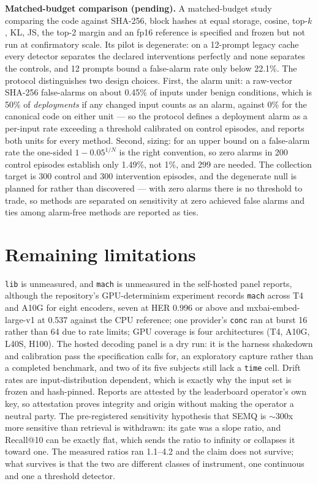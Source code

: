 \documentclass{article}
\begin{document}
\textbf{Matched-budget comparison (pending).} A matched-budget study comparing the code against SHA-256, block hashes at equal storage, cosine, top-$k$, KL, JS, the top-2 margin and an fp16 reference is specified and frozen but not run at confirmatory scale. Its pilot is degenerate: on a 12-prompt legacy cache every detector separates the declared interventions perfectly and none separates the controls, and 12 prompts bound a false-alarm rate only below 22.1\%. The protocol distinguishes two design choices. First, the alarm unit: a raw-vector SHA-256 false-alarms on about 0.45\% of inputs under benign conditions, which is 50\% of \emph{deployments} if any changed input counts as an alarm, against 0\% for the canonical code on either unit --- so the protocol defines a deployment alarm as a per-input rate exceeding a threshold calibrated on control episodes, and reports both units for every method. Second, sizing: for an upper bound on a false-alarm rate the one-sided $1-0.05^{1/N}$ is the right convention, so zero alarms in 200 control episodes establish only 1.49\%, not 1\%, and 299 are needed. The collection target is 300 control and 300 intervention episodes, and the degenerate null is planned for rather than discovered --- with zero alarms there is no threshold to trade, so methods are separated on sensitivity at zero achieved false alarms and ties among alarm-free methods are reported as ties.

\section{Remaining limitations}\label{app:limits}

\texttt{lib} is unmeasured, and \texttt{mach} is unmeasured in the self-hosted panel reports, although the repository's GPU-determinism experiment records \texttt{mach} across T4 and A10G for eight encoders, seven at HER 0.996 or above and mxbai-embed-large-v1 at 0.537 against the CPU reference; one provider's \texttt{conc} ran at burst 16 rather than 64 due to rate limits; GPU coverage is four architectures (T4, A10G, L40S, H100). The hosted decoding panel is a dry run: it is the harness shakedown and calibration pass the specification calls for, an exploratory capture rather than a completed benchmark, and two of its five subjects still lack a \texttt{time} cell. Drift rates are input-distribution dependent, which is exactly why the input set is frozen and hash-pinned. Reports are attested by the leaderboard operator's own key, so attestation proves integrity and origin without making the operator a neutral party. The pre-registered sensitivity hypothesis that SEMQ is ${\sim}300$x more sensitive than retrieval is withdrawn: its gate was a slope ratio, and Recall@10 can be exactly flat, which sends the ratio to infinity or collapses it toward one. The measured ratios ran 1.1--4.2 and the claim does not survive; what survives is that the two are different classes of instrument, one continuous and one a threshold detector.
\end{document}

